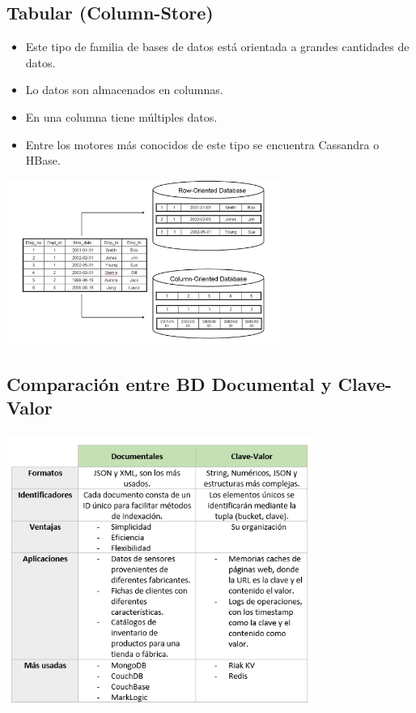 \documentclass[%
 reprint,
 amsmath,amssymb,
 aps,
]{revtex4-1}
\begin{document}
\subsection{Tabular (Column-Store)}
\begin{itemize}
		\item Este tipo de familia de bases de datos está orientada a grandes cantidades de datos.
		\item Lo datos son almacenados en columnas.
		\item En una columna tiene múltiples datos.
                     \item Entre los motores más conocidos de este tipo se encuentra Cassandra o HBase.
	          \end{itemize} 
 \begin{center}
	\includegraphics[width=9cm]{./Imagenes/5}
\end{center}	
\subsection{Comparación entre BD Documental y Clave-Valor}
		\begin{center}
		\includegraphics[width=10cm,height=9cm]{./Imagenes/cuadro}
		\end{center}	
\end{document}
